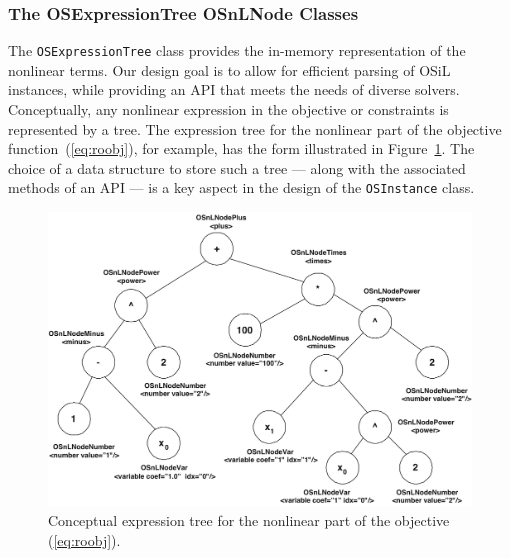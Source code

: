 \documentclass[11pt]{article}
\newcommand{\figurepath}{./figures}
\newcounter{Fig}
\renewcommand{\_}{{\char"5F}}
\renewcommand{\{}{{\char"7B}}
\renewcommand{\}}{{\char"7D}}
\renewcommand{\^}{{\char"0D}}
\renewcommand{\'}{{\char"0D}}
\begin{document}
\begin{enumerate}[Step 1:]
\subsubsection{The OSExpressionTree OSnLNode Classes}\label{section:osexpressiontreeclass}

The {\tt OSExpressionTree} class provides the in-memory representation 
of the nonlinear terms.  Our design goal is  to allow for efficient parsing of OSiL instances, 
while providing an API that meets the needs of diverse solvers.  Conceptually, any nonlinear expression in the 
objective or constraints is represented by a tree.  The expression tree for the nonlinear part of the 
objective function~(\ref{eq:roobj}), for example, has the form illustrated in Figure~\ref{figure:expressiontree}.  
The choice of a data structure to store such a tree --- along with the associated methods of an API --- is a key aspect 
in the design of the {\tt OSInstance} class.

\begin{figure}[ht]
\centering
\includegraphics[scale=0.38]{./figures/expressiontree.png}
\caption{Conceptual expression tree for the nonlinear part of the objective (\ref{eq:roobj}).} \label{figure:expressiontree}
\end{figure}



\end{enumerate}
\end{document}

